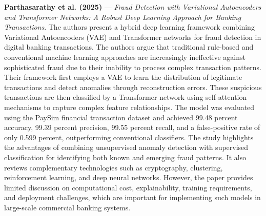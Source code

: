 \documentclass[conference]{IEEEtran}
\begin{document}
\noindent\textbf{Parthasarathy et al. (2025)}\nocite{Parthasarathy2025VAETransformer} --- \emph{Fraud Detection with Variational Autoencoders and Transformer Networks: A Robust Deep Learning Approach for Banking Transactions}. The authors present a hybrid deep learning framework combining Variational Autoencoders (VAE) and Transformer networks for fraud detection in digital banking transactions. The authors argue that traditional rule-based and conventional machine learning approaches are increasingly ineffective against sophisticated fraud due to their inability to process complex transaction patterns. Their framework first employs a VAE to learn the distribution of legitimate transactions and detect anomalies through reconstruction errors. These suspicious transactions are then classified by a Transformer network using self-attention mechanisms to capture complex feature relationships. The model was evaluated using the PaySim financial transaction dataset and achieved 99.48 percent accuracy, 99.39 percent precision, 99.55 percent recall, and a false-positive rate of only 0.599 percent, outperforming conventional classifiers. The study highlights the advantages of combining unsupervised anomaly detection with supervised classification for identifying both known and emerging fraud patterns. It also reviews complementary technologies such as cryptography, clustering, reinforcement learning, and deep neural networks. However, the paper provides limited discussion on computational cost, explainability, training requirements, and deployment challenges, which are important for implementing such models in large-scale commercial banking systems.

\par\medskip
\end{document}
